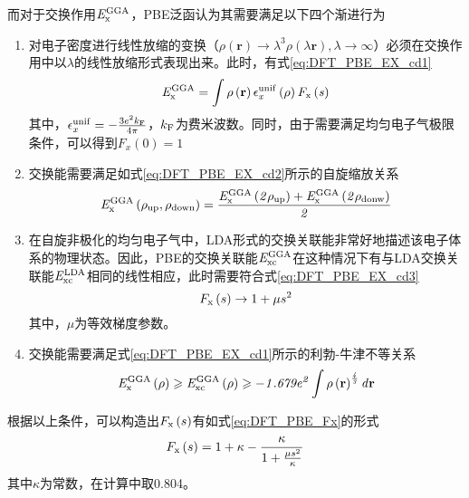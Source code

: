 而对于交换作用$\it E_{\rm x}^{\rm GGA} \it$，PBE泛函认为其需要满足以下四个渐进行为\chinesecolon
\begin{enumerate}[labelsep=0em,label=（\arabic*）,wide]
    \item 对电子密度进行线性放缩的变换（$\rho\left({\bm r}\right)\rightarrow \lambda^3\rho(\lambda {\bm r}), \lambda\rightarrow \infty$）必须在交换作用中以$\lambda$的线性放缩形式表现出来。此时，有式\eqref{eq:DFT_PBE_EX_cd1}\chinesecolon
    \begin{equation}
        \label{eq:DFT_PBE_EX_cd1}
        \it E_{\rm x}^{\rm GGA} \it=\int\rho\left({\mathbf r}\right)\epsilon_x^{\rm unif}\left(\rho\right)F_{\rm x}\left(s\right)
    \end{equation}
    其中，$\epsilon_x^{\rm unif}=-\frac{3e^2k_{\rm F}}{4\pi}$，$k_{\rm F}$为费米波数。同时，由于需要满足均匀电子气极限条件，可以得到$F_{x}\left(0\right)=1$
    \item 交换能需要满足如式\eqref{eq:DFT_PBE_EX_cd2}所示的自旋缩放关系\chinesecolon
    \begin{equation}
        \label{eq:DFT_PBE_EX_cd2}
        \it E_{\rm x}^{\rm GGA} \it\left(\rho_{\rm up},\rho_{\rm down}\right)=\frac{\it E_{\rm x}^{\rm GGA} \it\left(2\rho_{\rm up}\right)+\it E_{\rm x}^{\rm GGA} \it\left(2\rho_{\rm donw}\right)}{2}
    \end{equation}
    \item 在自旋非极化的均匀电子气中，LDA形式的交换关联能非常好地描述该电子体系的物理状态。因此，PBE的交换关联能$\it E_{\rm xc}^{\rm GGA} \it$在这种情况下有与LDA交换关联能$\it E_{\rm xc}^{\rm LDA} \it$相同的线性相应，此时需要符合式\eqref{eq:DFT_PBE_EX_cd3}\chinesecolon
    \begin{equation}
        \label{eq:DFT_PBE_EX_cd3}
        F_{\rm x}\left(s\right)\rightarrow 1+\mu s^2
    \end{equation}
    其中，$\mu$为等效梯度参数。
    \item 交换能需要满足式\eqref{eq:DFT_PBE_EX_cd1}所示的利勃-牛津不等关系\chinesecolon
    \begin{equation}
        \label{eq:DFT_PBE_EX_cd4}
        \it E_{\rm x}^{\rm GGA} \it\left(\rho\right)\geqslant\it E_{\rm xc}^{\rm GGA} \it\left(\rho\right)\geqslant -1.679e^2\int \rho\left({\mathbf r}\right)^{\frac{4}{3}} d{\mathbf r}
    \end{equation}
\end{enumerate}

根据以上条件，可以构造出$F_{\rm x}\left(s\right)$有如式\eqref{eq:DFT_PBE_Fx}的形式\chinesecolon
\begin{equation}
    \label{eq:DFT_PBE_Fx}
    F_{\rm x}\left(s\right)=1+\kappa -\frac{\kappa }{1+\frac{\mu s^2}{\kappa}}
\end{equation}
其中$\kappa$为常数，在计算中取0.804。

